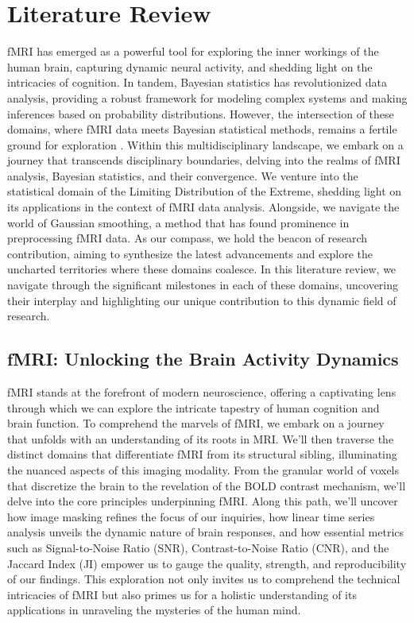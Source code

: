 \chapter{Literature Review}  

fMRI has emerged as a powerful tool for exploring the inner workings of the human brain, capturing dynamic neural activity, and shedding light on the intricacies of cognition. In tandem, Bayesian statistics has revolutionized data analysis, providing a robust framework for modeling complex systems and making inferences based on probability distributions. However, the intersection of these domains, where fMRI data meets Bayesian statistical methods, remains a fertile ground for exploration \cite{worsley2002general}. Within this multidisciplinary landscape, we embark on a journey that transcends disciplinary boundaries, delving into the realms of fMRI analysis, Bayesian statistics, and their convergence. We venture into the statistical domain of the Limiting Distribution of the Extreme, shedding light on its applications in the context of fMRI data analysis. Alongside, we navigate the world of Gaussian smoothing, a method that has found prominence in preprocessing fMRI data. As our compass, we hold the beacon of research contribution, aiming to synthesize the latest advancements and explore the uncharted territories where these domains coalesce. In this literature review, we navigate through the significant milestones in each of these domains, uncovering their interplay and highlighting our unique contribution to this dynamic field of research.

\section{fMRI: Unlocking the Brain Activity Dynamics}

fMRI stands at the forefront of modern neuroscience, offering a captivating lens through which we can explore the intricate tapestry of human cognition and brain function. To comprehend the marvels of fMRI, we embark on a journey that unfolds with an understanding of its roots in MRI. We'll then traverse the distinct domains that differentiate fMRI from its structural sibling, illuminating the nuanced aspects of this imaging modality. From the granular world of voxels that discretize the brain to the revelation of the BOLD contrast mechanism, we'll delve into the core principles underpinning fMRI. Along this path, we'll uncover how image masking refines the focus of our inquiries, how linear time series analysis unveils the dynamic nature of brain responses, and how essential metrics such as Signal-to-Noise Ratio (SNR), Contrast-to-Noise Ratio (CNR), and the Jaccard Index (JI) empower us to gauge the quality, strength, and reproducibility of our findings. This exploration not only invites us to comprehend the technical intricacies of fMRI but also primes us for a holistic understanding of its applications in unraveling the mysteries of the human mind.

